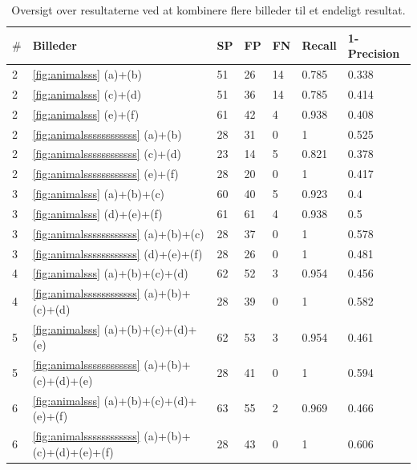 \begin{table}[H]
	\begin{tabular}{l|l|l|l|l|l|l}
		$\#$ & Billeder & SP & FP & FN & Recall & 1-Precision \\\hline
		2	&	\ref{fig:animalsss} (a)+(b)	&51	&26	&14 							&0.785 	&0.338\\\hline
		2	&	\ref{fig:animalsss} (c)+(d)	&51	&36	&14 							&0.785 	&0.414\\\hline
		2	&	\ref{fig:animalsss} (e)+(f)	&61	&42	&4 								&0.938 	&0.408\\\hline
		2	&	\ref{fig:animalssssssssssss} (a)+(b) &28 &31 &0 					&1 		&0.525\\\hline
		2	&	\ref{fig:animalssssssssssss} (c)+(d) &23	&14	&5 					&0.821 	&0.378\\\hline
		2	&	\ref{fig:animalssssssssssss} (e)+(f) &28	&20	&0 					&1 		&0.417\\\hline
		3	&	\ref{fig:animalsss} (a)+(b)+(c)	&60	&40	&5 							&0.923 	&0.4\\\hline
		3	&	\ref{fig:animalsss} (d)+(e)+(f)	&61	&61	&4 							&0.938 	&0.5\\\hline
		3	&	\ref{fig:animalssssssssssss} (a)+(b)+(c)	&28	&37	&0 				&1 		&0.578\\\hline
		3	&	\ref{fig:animalssssssssssss} (d)+(e)+(f)	&28	&26	&0 				&1 		&0.481\\\hline
		4	&	\ref{fig:animalsss} (a)+(b)+(c)+(d)	& 62 &52	&3 					&0.954 	&0.456\\\hline
		4	&	\ref{fig:animalssssssssssss} (a)+(b)+(c)+(d) &28	&39	&0 			&1 		&0.582\\\hline
		5	&	\ref{fig:animalsss} (a)+(b)+(c)+(d)+(e)	&62	&53	&3 					&0.954 	&0.461\\\hline
		5	&	\ref{fig:animalssssssssssss} (a)+(b)+(c)+(d)+(e)	&28	&41	&0 		&1 		&0.594\\\hline
		6	&	\ref{fig:animalsss} (a)+(b)+(c)+(d)+(e)+(f)	&63	&55	&2 				&0.969 	&0.466\\\hline
		6	&	\ref{fig:animalssssssssssss} (a)+(b)+(c)+(d)+(e)+(f) &28	&43 &0 	&1 		&0.606
	\end{tabular}
	\caption{Oversigt over resultaterne ved at kombinere flere billeder til et endeligt resultat.\label{tab:postmethod_tabel2222}}
\end{table}

